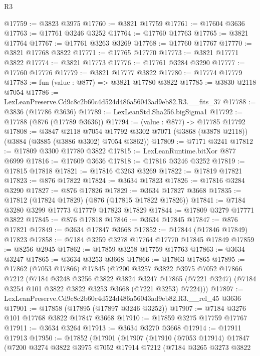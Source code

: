 \begin{lexlean}{R3}
\begin{coremodule}
@17759 := @3823 @3975
@17760 := @3821 @17759
@17761 := @17604 @3636
@17763 := @17761 @3246 @3252
@17764 := @17760 @17763
@17765 := @3821 @17764
@17767 := @17761 @3263 @3269
@17768 := @17760 @17767
@17770 := @3821 @17768 @3822
@17771 := @17765 @17770
@17773 := @3821 @17771 @3822
@17774 := @3821 @17773
@17776 := @17761 @3284 @3290
@17777 := @17760 @17776
@17779 := @3821 @17777 @3822
@17780 := @17774 @17779
@17783 := fun (value : @877) => @3821 @17780 @3822
@17785 := @3830 @2118 @7054
@17786 := LexLeanPreserve.Cd9c8c2b60c4d524d486a56043ad9eb82.R3.__fits_37
@17788 := @3836 (@17786 @3636)
@17789 := LexLeanStd.Sha256.bigSigma1
@17792 := @17788 (@876 (@17789 @3636))
@17794 := (value : @877) -> @17785 @17792
@17808 := @3847
    @2118
    @7054
    @17792
    @3302
    @7071
    (@3868 (@3878 @2118))
    (@3884 (@3885 (@3886 @3302) @7054 @3862))
@17809 := @7171 @3241
@17812 := @17809 @3300 @17780 @3822
@17815 := LexLeanRuntime.bitXor @877 @6999
@17816 := @17609 @3636
@17818 := @17816 @3246 @3252
@17819 := @17815 @17818
@17821 := @17816 @3263 @3269
@17822 := @17819 @17821
@17823 := @876 @17822
@17824 := @3634 @17823
@17826 := @17816 @3284 @3290
@17827 := @876 @17826
@17829 := @3634 @17827 @3668
@17835 := @17812 (@17824 @17829) (@876 (@17815 @17822 @17826))
@17841 := @7184 @3280 @3299 @17773 @17779 @17823 @17829
@17844 := @17809 @3279 @17771 @3822
@17845 := @876 @17818
@17846 := @3634 @17845
@17847 := @876 @17821
@17849 := @3634 @17847 @3668
@17852 := @17844 (@17846 @17849) @17823
@17858 := @7184 @3259 @3278 @17764 @17770 @17845 @17849
@17859 := @8256 @2945
@17862 := @17859 @3258 @17759 @17763
@17863 := @3634 @3247
@17865 := @3634 @3253 @3668
@17866 := @17863 @17865
@17895 := @17862
    (@7053 @17866)
    @17845
    (@7200
      @3257
      @3822
      @3975
      @7052
      @17866
      @7212
      (@7184
        @3248
        @3256
        @3822
        @3824
        @3247
        @17865
        (@7221 @3247)
        (@7184 @3254 @101 @3822 @3822 @3253 @3668 (@7221 @3253) @7224)))
@17897 := LexLeanPreserve.Cd9c8c2b60c4d524d486a56043ad9eb82.R3.__rel_45 @3636
@17901 := @17858 (@17895 (@17897 @3246 @3252))
@17907 := @7184 @3276 @101 @17768 @3822 @17847 @3668
@17910 := @17859 @3275 @17759 @17767
@17911 := @3634 @3264
@17913 := @3634 @3270 @3668
@17914 := @17911 @17913
@17950 := @17852
    (@17901
      (@17907
        (@17910
          (@7053 @17914)
          @17847
          (@7200
            @3274
            @3822
            @3975
            @7052
            @17914
            @7212
            (@7184
              @3265
              @3273
              @3822

\end{coremodule}
\end{lexlean}

